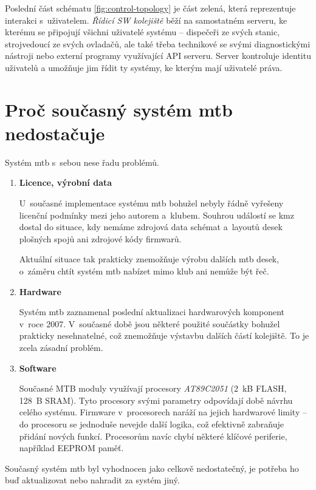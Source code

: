 Poslední část schématu \ref{fig:control-topology} je část zelená, která
reprezentuje interakci s~uživatelem. \textit{Řídicí SW kolejiště} běží na
samostatném serveru, ke kterému se připojují všichni uživatelé systému –
dispečeři ze svých stanic, strojvedoucí ze svých ovladačů, ale také třeba
technikové se svými diagnostickými nástroji nebo externí programy využívající
API serveru. Server kontroluje identitu uživatelů a umožňuje jim řídit ty
systémy, ke kterým mají uživatelé práva.

\section{Proč současný systém \gls{mtb} nedostačuje} \label{sec:mtb_fail}

Systém \gls{mtb} s~sebou nese řadu problémů.

\begin{enumerate}
\item \textbf{Licence, výrobní data}

U~současné implementace systému \gls{mtb} bohužel nebyly řádně vyřešeny licenční
podmínky mezi jeho autorem a~klubem. Souhrou událostí se \gls{kmz} dostal do
situace, kdy nemáme zdrojová data schémat a~layoutů desek plošných spojů ani
zdrojové kódy firmwarů.

Aktuální situace tak prakticky znemožňuje výrobu dalších \gls{mtb} desek,
o~záměru chtít systém \gls{mtb} nabízet mimo klub ani nemůže být řeč.

\item \textbf{Hardware}

Systém \gls{mtb} zaznamenal poslední aktualizaci hardwarových komponent v~roce
2007. V~současné době jsou některé použité součástky bohužel prakticky
nesehnatelné, což znemožňuje výstavbu dalších částí kolejiště. To je zcela
zásadní problém.

\item \textbf{Software}

Současné MTB moduly využívají procesory \textit{AT89C2051} (2~kB FLASH,
128~B SRAM). Tyto procesory svými parametry odpovídají době návrhu celého
systému. Firmware v~procesorech naráží na jejich hardwarové limity – do
procesoru se jednoduše nevejde další logika, což efektivně zabraňuje přidání
nových funkcí. Procesorům navíc chybí některé klíčové periferie, například
EEPROM paměť.

\end{enumerate}

Současný systém \gls{mtb} byl vyhodnocen jako celkově nedostatečný, je potřeba
ho buď aktualizovat nebo nahradit za systém jiný.

